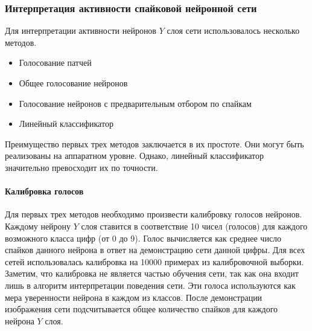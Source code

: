 \documentclass[a4paper]{article}
\begin{document}
\subsubsection{Интерпретация активности спайковой нейронной сети}
Для интерпретации активности нейронов $Y$ слоя сети использовалось несколько методов.

\begin{itemize}
 \item Голосование патчей
 \item Общее голосование нейронов
 \item Голосование нейронов с предварительным отбором по спайкам
 \item Линейный классификатор
\end{itemize}

Преимущество первых трех методов заключается в их простоте. Они могут быть реализованы на аппаратном уровне. Однако, линейный классификатор значительно превосходит их по точности.\\

\paragraph{Калибровка голосов} \label{calibration}
Для первых трех методов необходимо произвести калибровку голосов нейронов. Каждому нейрону $Y$ слоя ставится в соответствие 10 чисел (голосов) для каждого возможного класса цифр (от 0 до 9). Голос вычисляется как среднее число спайков данного нейрона в ответ на демонстрацию сети данной цифры. Для всех сетей использовалась калибровка на 10000 примерах из калибровочной выборки. Заметим, что калибровка не является частью обучения сети, так как она входит лишь в алгоритм интерпретации поведения сети. Эти голоса используются как мера уверенности нейрона в каждом из классов. После демонстрации изображения сети подсчитывается общее количество спайков для каждого нейрона $Y$ слоя.
\end{document}
